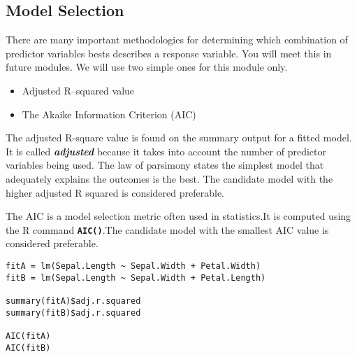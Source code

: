 \documentclass[a4paper,12pt]{article}
\begin{document}
\subsection{Model Selection}
There are many important methodologies for determining which combination of predictor variables bests describes a response variable. You will meet this in future modules.
We will use two simple ones for this module only.
\begin{itemize}
\item Adjusted R–squared value
\item The Akaike Information Criterion (AIC)
\end{itemize}


The adjusted R-square value is found on the summary output for a fitted model. It is called \textbf{\emph{adjusted}} because it takes into account the number of predictor variables being used. The law of parsimony states the simplest model that adequately explains the outcomes is the best. The candidate model with the higher adjusted R squared is considered preferable.

The AIC is a model selection metric often used in statistics.It is computed using the R command
\texttt{\textbf{AIC()}}.The candidate model with the smallest AIC value is considered preferable.

\begin{framed}
\begin{verbatim}
fitA = lm(Sepal.Length ~ Sepal.Width + Petal.Width)
fitB = lm(Sepal.Length ~ Sepal.Width + Petal.Length)

summary(fitA)$adj.r.squared
summary(fitB)$adj.r.squared

AIC(fitA)
AIC(fitB)
\end{verbatim}
\end{framed}

\end{document}
